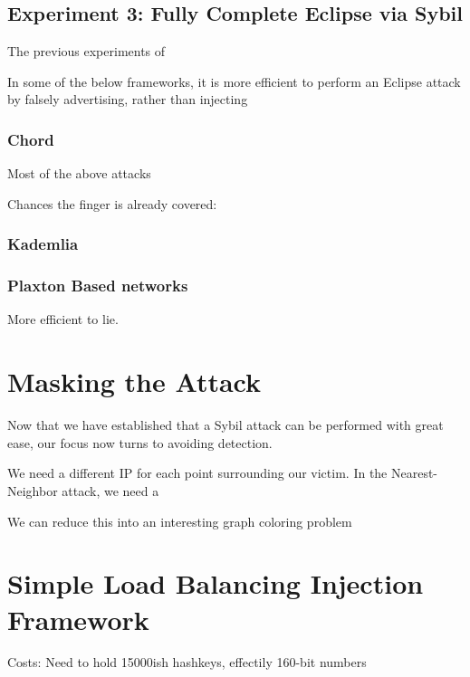 \documentclass[10pt,a4paper]{article}
\begin{document}
\subsection{Experiment 3: Fully Complete Eclipse via Sybil}
The previous experiments of

In some of the below frameworks, it is more efficient to perform an Eclipse attack by falsely advertising, rather than injecting


\subsubsection{Chord}
Most of the above attacks



Chances the finger is already covered:

\subsubsection{Kademlia}

\subsubsection{Plaxton Based networks}
More efficient to lie.


\section{Masking the Attack}
Now that we have established that a Sybil attack can be performed with great ease, our focus now turns to avoiding detection.

We need a different IP for each point surrounding our victim.  In the Nearest-Neighbor attack, we need a 

We can reduce this into an interesting graph coloring problem

\section{Simple Load Balancing Injection Framework}

Costs:  Need to hold 15000ish hashkeys, effectily 160-bit numbers



\end{document}
